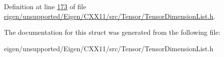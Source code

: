 Definition at line \hyperlink{eigen_2unsupported_2_eigen_2_c_x_x11_2src_2_tensor_2_tensor_dimension_list_8h_source_l00173}{173} of file \hyperlink{eigen_2unsupported_2_eigen_2_c_x_x11_2src_2_tensor_2_tensor_dimension_list_8h_source}{eigen/unsupported/\+Eigen/\+C\+X\+X11/src/\+Tensor/\+Tensor\+Dimension\+List.\+h}.



The documentation for this struct was generated from the following file\+:\begin{DoxyCompactItemize}
\item 
eigen/unsupported/\+Eigen/\+C\+X\+X11/src/\+Tensor/\+Tensor\+Dimension\+List.\+h\end{DoxyCompactItemize}
